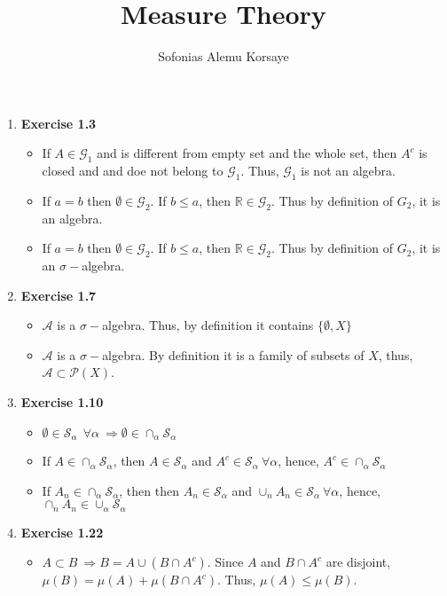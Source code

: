 \documentclass[12pt, letterpaper,bibtotoc, tablecaptionabove, figurecaptionabove]{article}
\begin{document}
\title{ Measure Theory }
\author{ Sofonias Alemu Korsaye}
\maketitle
\begin{enumerate}
\item {\bf{Exercise 1.3}}
\begin{itemize}
\item If $A\in\mathcal G_1$ and is different from empty set and the whole set, then $A^c$ is closed and and doe not belong to $\mathcal G_1$. Thus, $\mathcal G_1$ is not an algebra.  
\item If $a=b$ then $\emptyset\in \mathcal G_2$. If $b\leq a$, then $\mathbb R\in \mathcal G_2$. Thus by definition of $G_2$, it is an algebra.
\item If $a=b$ then $\emptyset\in \mathcal G_2$. If $b\leq a$, then $\mathbb R\in \mathcal G_2$. Thus by definition of $G_2$, it  is an $\sigma-$algebra.
\end{itemize}
\item{\bf{Exercise 1.7}}
\begin{itemize}
\item  $\mathcal A$ is a $\sigma-$algebra. Thus, by definition it contains $\{\emptyset,X\}$
\item  $\mathcal A$ is a $\sigma-$algebra. By definition it is a family of subsets of $X$, thus, $\mathcal A\subset \mathcal P(X)$.
\end{itemize}
\item{\bf{Exercise 1.10}}
\begin{itemize}
\item $\emptyset\in \mathcal S_\alpha \ \ \forall \alpha \ \Rightarrow \emptyset \in \cap_\alpha \mathcal S_\alpha$
\item If $A\in \cap_\alpha \mathcal S_\alpha$, then $A\in \mathcal S_\alpha $ and $A^c\in \mathcal S_\alpha \ \forall \alpha$, hence, $A^c\in \cap_\alpha \mathcal S_\alpha$
\item If $A_n\in\cap_\alpha\mathcal S_\alpha$, then  then $A_n\in \mathcal S_\alpha $ and $\cup_n A_n\in \mathcal S_\alpha \ \forall \alpha$, hence,  $\cap_n A_n \in \cup_\alpha \mathcal S_\alpha$
\end{itemize}
\item{\bf{Exercise 1.22}}
\begin{itemize}
\item  $A\subset B \ \Rightarrow B=A\cup (B\cap A^c)$. Since $A$ and $B\cap A^c$ are disjoint, $\mu(B)=\mu(A)+\mu(B\cap A^c)$. Thus, $\mu(A)\leq\mu(B)$.

\end{itemize}
\end{enumerate}
\end{document}
